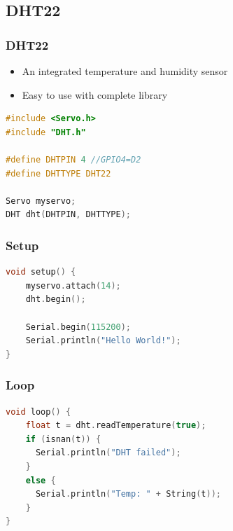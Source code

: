 \documentclass[compress, aspectratio=32]{beamer}
\begin{document}
\subsection{DHT22}
\begin{frame}[fragile]
    \frametitle{DHT22}
    \begin{itemize}
        \item An integrated temperature and humidity sensor
        \item Easy to use with complete library
    \end{itemize}
    \begin{lstlisting}[language=c, firstnumber=1]
#include <Servo.h>
#include "DHT.h"

#define DHTPIN 4 //GPIO4=D2
#define DHTTYPE DHT22

Servo myservo;
DHT dht(DHTPIN, DHTTYPE);
    \end{lstlisting}
\end{frame}

\begin{frame}[fragile]
    \frametitle{Setup}
    \begin{lstlisting}[language=c, firstnumber=last]
void setup() {
    myservo.attach(14);
    dht.begin();
    
    Serial.begin(115200);
    Serial.println("Hello World!");
}
    \end{lstlisting}
\end{frame}

\begin{frame}[fragile]
    \frametitle{Loop}
    \begin{lstlisting}[language=c, firstnumber=last]
void loop() {
    float t = dht.readTemperature(true);
    if (isnan(t)) {
      Serial.println("DHT failed");
    }
    else {
      Serial.println("Temp: " + String(t));
    }
}
    \end{lstlisting}
\end{frame}
\end{document}
